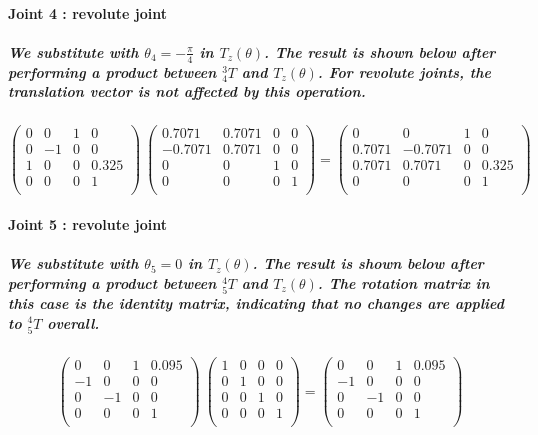 \paragraph{Joint 4 : revolute joint}
\subparagraph{We substitute with $\theta_4 = -\frac{\pi}{4}$ in $T_z(\theta)$. The result is shown below after performing a product between $^{3}_4T$ and $T_z(\theta)$. For revolute joints, the translation vector is not affected by this operation.}
\[
\begin{pmatrix}
0 & 0 & 1 & 0 \\
0 & -1 & 0 & 0 \\
1 & 0 & 0 & 0.325 \\
0 & 0 & 0 & 1 \\
\end{pmatrix}
\
\begin{pmatrix}
0.7071 & 0.7071 & 0 & 0 \\
-0.7071 & 0.7071 & 0 & 0 \\
0 & 0 & 1 & 0 \\
0 & 0 & 0 & 1 \\
\end{pmatrix}
=
\begin{pmatrix}
0 & 0 & 1 & 0 \\
0.7071 & -0.7071 & 0 & 0 \\
0.7071 & 0.7071 & 0 & 0.325 \\
0 & 0 & 0 & 1 \\
\end{pmatrix}
\]

\paragraph{Joint 5 : revolute joint}
\subparagraph{We substitute with $\theta_5 = 0$ in $T_z(\theta)$. The result is shown below after performing a product between $^{4}_5T$ and $T_z(\theta)$. The rotation matrix in this case is the identity matrix, indicating that no changes are applied to \( ^{4}_5T \) overall.}
\[
\begin{pmatrix}
0 & 0 & 1 & 0.095 \\
-1 & 0 & 0 & 0 \\
0 & -1 & 0 & 0 \\
0 & 0 & 0 & 1 \\
\end{pmatrix}
\
\begin{pmatrix}
1 & 0 & 0 & 0 \\
0 & 1 & 0 & 0 \\
0 & 0 & 1 & 0 \\
0 & 0 & 0 & 1 \\
\end{pmatrix}
=
\begin{pmatrix}
0 & 0 & 1 & 0.095 \\
-1 & 0 & 0 & 0 \\
0 & -1 & 0 & 0 \\
0 & 0 & 0 & 1 \\
\end{pmatrix}
\]

